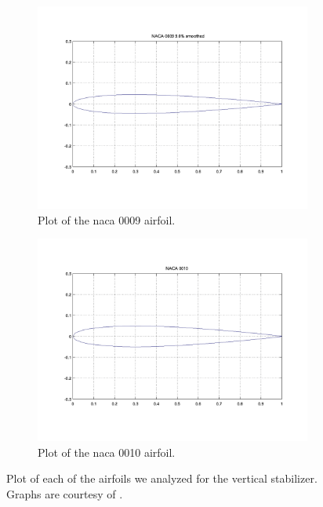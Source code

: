 \begin{figure}[htpb]
    \centering
    \begin{subfigure}{0.49\textwidth}
        \centering
        \includegraphics[width=\textwidth]{Figures/NACA_0009.png}
        \caption{Plot of the \acrshort{naca} 0009 airfoil.}
        \label{fig:naca_0009_plot}
    \end{subfigure}
    \begin{subfigure}{0.49\textwidth}
        \centering
        \includegraphics[width=\textwidth]{Figures/NACA_0010.png}
        \caption{Plot of the \acrshort{naca} 0010 airfoil.}
        \label{fig:naca_0010_plot}
    \end{subfigure}
    \caption[Airfoil choices for the vertical stabilizer]{Plot of each of the airfoils we analyzed for the vertical stabilizer. Graphs are courtesy of \citet{uiuc2024}.}
    \label{fig:vertical_stabilizer_airfoil_plots}
\end{figure}

